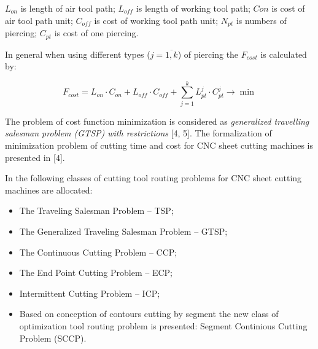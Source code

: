 \documentclass[runningheads]{llncs}
\begin{document}
$L_{on}$ is length of air tool path;
$L_{off}$ is length of working tool path;
$C{on}$ is cost of air tool path unit;
$C_{off}$ is cost of working tool path unit;
$N_{pt}$ is numbers of piercing;
$C_{pt}$ is cost of one piercing.

In general when using different types ($j = \overline{1, k}$) of piercing
the $F_{cost}$ is calculated by:

\begin{equation}
  F_{cost} =
  L_{on} \cdot C_{on} +
  L_{off} \cdot C_{off} +
  \sum_{j=1}^k L_{pt}^j \cdot C_{pt}^j
  \to \min
  \label{cost-n}
\end{equation}

The problem of cost function minimization is considered as
\textit{generalized travelling salesman problem (GTSP) with restrictions}
[4, 5].
The formalization of minimization problem of cutting time and cost
for CNC sheet cutting machines is presented in [4].

In \cite{Dewil2016Nov,Hoeft1997Sep}
the following classes of cutting tool routing problems
for CNC sheet cutting machines are allocated:

\begin{itemize}

\item The Traveling Salesman Problem – TSP;

\item The Generalized Traveling Salesman Problem – GTSP;

\item The Continuous Cutting Problem – CCP;

\item The End Point Cutting Problem – ECP;

\item Intermittent Cutting Problem – ICP;

\item Based on conception of contours cutting by segment \cite{Petunin2015Nov}
the new class of optimization tool routing problem is presented:
Segment Continious Cutting Problem (SCCP).

\end{itemize}
\end{document}
